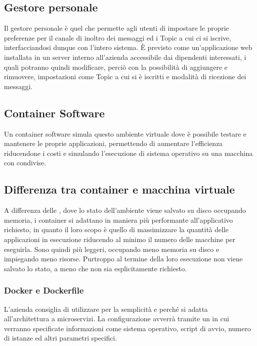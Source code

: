 	
	\subsection{Gestore personale}
	Il gestore personale è quel  che permette agli utenti di impostare le proprie preferenze per il canale di inoltro dei messaggi ed i Topic a cui ci si iscrive, interfacciandosi dunque con l'intero sistema.
	È previsto come un'applicazione web installata in un server interno all'azienda accessibile dai dipendenti interessati, i quali potranno quindi modificare, perciò con la possibilità di aggiungere e rimuovere, impostazioni come Topic a cui si è iscritti e modalità di ricezione dei messaggi.
	
	\subsection{Container Software}
	
		Un container software simula questo ambiente virtuale dove è possibile testare e mantenere le proprie applicazioni, permettendo di aumentare l'efficienza riducendone i costi e simulando l'esecuzione di sistema operativo su una macchina con  condivise.
		
		\subsection{Differenza tra container e macchina virtuale}
		A differenza delle , dove lo stato dell'ambiente viene salvato su disco occupando memoria, i container si adattano in maniera più performante all'applicativo richiesto, in quanto il loro scopo è quello di massimizzare la quantità delle applicazioni in esecuzione riducendo al minimo il numero delle macchine per eseguirla.
		Sono quindi più leggeri, occupando meno memoria su disco e impiegando meno risorse. Purtroppo al termine della loro esecuzione non viene salvato lo stato, a meno che non sia esplicitamente richiesto.
		
		\subsubsection{Docker e Dockerfile}
		L'azienda consiglia di utilizzare  per la semplicità e perché si adatta all'architettura a microservizi.
		La configurazione avverrà tramite un  in cui verranno specificate informazioni come sistema operativo, script di avvio, numero di istanze ed altri parametri specifici.

